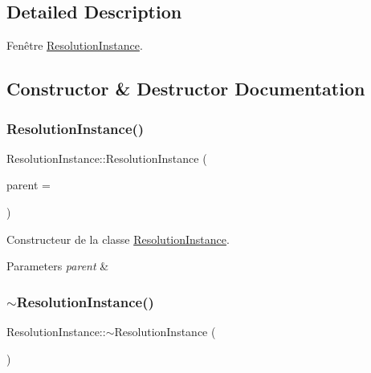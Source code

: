 \subsection{Detailed Description}
Fenêtre \hyperlink{classResolutionInstance}{Resolution\+Instance}. 

\subsection{Constructor \& Destructor Documentation}
\mbox{\label{classResolutionInstance_a90e1ee7d8245bed88624a159b00cb6a7}} 
\subsubsection{\texorpdfstring{Resolution\+Instance()}{ResolutionInstance()}}
{\footnotesize\ttfamily Resolution\+Instance\+::\+Resolution\+Instance (\begin{DoxyParamCaption}\item[{Q\+Widget $\ast$}]{parent = {} }\end{DoxyParamCaption})\hspace{0.3cm}{\ttfamily [explicit]}}



Constructeur de la classe \hyperlink{classResolutionInstance}{Resolution\+Instance}. 


\begin{DoxyParams}{Parameters}
{\em parent} & \\
\hline
\end{DoxyParams}
\mbox{\label{classResolutionInstance_acbc867c1e869aafcb0c20a5698e00aee}} 
\subsubsection{\texorpdfstring{$\sim$\+Resolution\+Instance()}{~ResolutionInstance()}}
{\footnotesize\ttfamily Resolution\+Instance\+::$\sim$\+Resolution\+Instance (\begin{DoxyParamCaption}{ }\end{DoxyParamCaption})}



